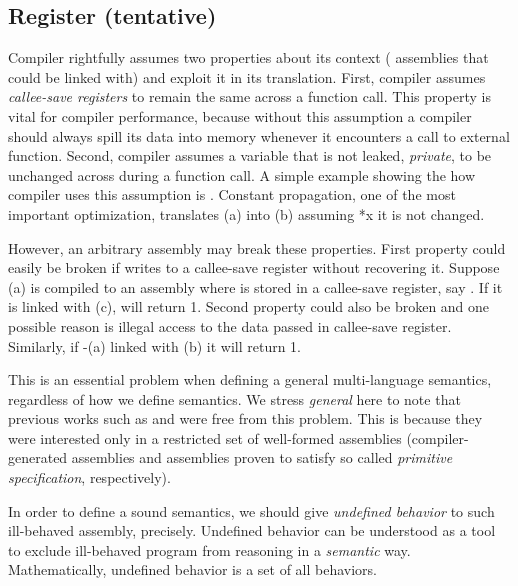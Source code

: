 {\subsection{Register (tentative)}\label{sec:overview:register}
Compiler rightfully assumes two properties about its context (\ie{} assemblies that could be linked with) and exploit it in its translation.
First, compiler assumes \textit{callee-save registers} to remain the same across a function call.
This property is vital for compiler performance, because without this assumption a compiler should always spill its data into memory whenever it encounters a call to external function.
Second, compiler assumes a variable that is not leaked, \ie{} \textit{private}, to be unchanged across during a function call.
A simple example showing the how compiler uses this assumption is .
Constant propagation, one of the most important optimization, translates (a) into (b) assuming *x it is not changed.

However, an arbitrary assembly may break these properties.
First property could easily be broken if  writes to a callee-save register without recovering it.
Suppose (a) is compiled to an assembly where  is stored in a callee-save register, say .
If it is linked with (c),  will return 1.
Second property could also be broken and one possible reason is illegal access to the data passed in callee-save register. %
Similarly, if -(a) linked with (b) it will return 1.

This is an essential problem when defining a general multi-language semantics, regardless of how we define semantics.
We stress \textit{general} here to note that previous works such as \scc{} and \ccx{} were free from this problem.
This is because they were interested only in a restricted set of well-formed assemblies (compiler-generated assemblies and assemblies proven to satisfy so called \textit{primitive specification}, respectively).

In order to define a sound semantics, we should give \textit{undefined behavior} to such ill-behaved assembly, precisely.
Undefined behavior can be understood as a tool to exclude ill-behaved program from reasoning in a \textit{semantic} way.
Mathematically, undefined behavior is a set of all behaviors.



}
